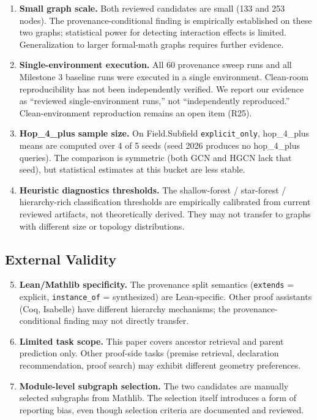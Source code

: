 \documentclass[runningheads]{llncs}
\newcommand{\enquote}[1]{``#1''}
\begin{document}
\begin{enumerate}
\item \textbf{Small graph scale.} Both reviewed candidates are small (133 and 253 nodes). The provenance-conditional finding is empirically established on these two graphs; statistical power for detecting interaction effects is limited. Generalization to larger formal-math graphs requires further evidence.

\item \textbf{Single-environment execution.} All 60 provenance sweep runs and all Milestone 3 baseline runs were executed in a single environment. Clean-room reproducibility has not been independently verified. We report our evidence as \enquote{reviewed single-environment runs,} not \enquote{independently reproduced.} Clean-environment reproduction remains an open item (R25).

\item \textbf{Hop\_4\_plus sample size.} On Field.Subfield \texttt{explicit\_only}, hop\_4\_plus means are computed over 4 of 5 seeds (seed 2026 produces no hop\_4\_plus queries). The comparison is symmetric (both GCN and HGCN lack that seed), but statistical estimates at this bucket are less stable.

\item \textbf{Heuristic diagnostics thresholds.} The shallow-forest / star-forest / hierarchy-rich classification thresholds are empirically calibrated from current reviewed artifacts, not theoretically derived. They may not transfer to graphs with different size or topology distributions.
\end{enumerate}

\subsection{External Validity}

\begin{enumerate}\setcounter{enumi}{4}
\item \textbf{Lean/Mathlib specificity.} The provenance split semantics (\texttt{extends} = explicit, \texttt{instance\_of} = synthesized) are Lean-specific. Other proof assistants (Coq, Isabelle) have different hierarchy mechanisms; the provenance-conditional finding may not directly transfer.

\item \textbf{Limited task scope.} This paper covers ancestor retrieval and parent prediction only. Other proof-side tasks (premise retrieval, declaration recommendation, proof search) may exhibit different geometry preferences.

\item \textbf{Module-level subgraph selection.} The two candidates are manually selected subgraphs from Mathlib. The selection itself introduces a form of reporting bias, even though selection criteria are documented and reviewed.
\end{enumerate}
\end{document}
